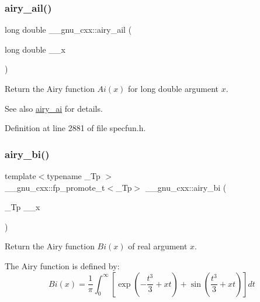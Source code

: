 \subsubsection{\texorpdfstring{airy\+\_\+ail()}{airy\_ail()}}
{\footnotesize\ttfamily long double \+\_\+\+\_\+gnu\+\_\+cxx\+::airy\+\_\+ail (\begin{DoxyParamCaption}\item[{long double}]{\+\_\+\+\_\+x }\end{DoxyParamCaption})\hspace{0.3cm}{\ttfamily [inline]}}

Return the Airy function $ Ai(x) $ for {\ttfamily long double} argument $ x $.

\begin{DoxySeeAlso}{See also}
\hyperlink{group__gnu__math__spec__func_gac84f8c4ad00ee677ad4d0b785925d983}{airy\+\_\+ai} for details. 
\end{DoxySeeAlso}


Definition at line 2881 of file specfun.\+h.

\mbox{\label{group__gnu__math__spec__func_ga33c172cab7f8e9c99537444c7e30801a}} 
\subsubsection{\texorpdfstring{airy\+\_\+bi()}{airy\_bi()}\hspace{0.1cm}{\footnotesize\ttfamily [1/2]}}
{\footnotesize\ttfamily template$<$typename \+\_\+\+Tp $>$ \\
\+\_\+\+\_\+gnu\+\_\+cxx\+::fp\+\_\+promote\+\_\+t$<$\+\_\+\+Tp$>$ \+\_\+\+\_\+gnu\+\_\+cxx\+::airy\+\_\+bi (\begin{DoxyParamCaption}\item[{\+\_\+\+Tp}]{\+\_\+\+\_\+x }\end{DoxyParamCaption})\hspace{0.3cm}{\ttfamily [inline]}}

Return the Airy function $ Bi(x) $ of real argument $ x $.

The Airy function is defined by\+: \[ Bi(x) = \frac{1}{\pi}\int_0^\infty \left[ \exp \left(-\frac{t^3}{3} + xt \right) + \sin \left(\frac{t^3}{3} + xt \right) \right] dt \]



